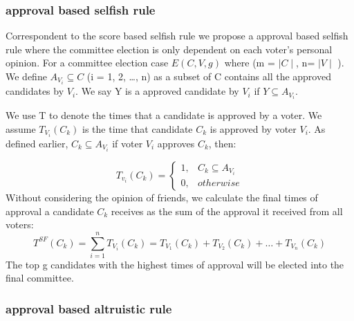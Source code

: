 \documentclass[
   a4paper,                      %
   tucfont,                      %
   english,                      %
   tuctitle,                     %
   intoc,                        %
   twoside,                      %
   captions=tableheading,        %
   openright,                    %
   final,                        %
   ]{tuc-thesis}                 %
\begin{document}
\subsubsection{approval based selfish rule}
Correspondent to the score based selfish rule we propose a approval based selfish rule where the committee election is only dependent on each voter's personal opinion. For a committee election case  $E(C,V,g)$ where (m = $\mid C \mid$, n= $\mid V \mid$ ). We define $A_{V_i}  \subseteq C$ (i = 1, 2,  \dots , n) as a subset of C contains all the approved candidates by $V_i$. We say Y is a approved candidate by $V_i$ if $Y \subseteq A_{V_i}$.

We use T to denote the times that a candidate is approved by a voter. We assume $T_{V_i}(C_k)$ is the time that candidate $C_k$ is approved by voter $V_i$. As defined earlier, $C_k \subseteq A_{V_i}$ if voter $V_i$ approves $C_k$, then: 

\begin{equation} 
        T_{v_i}(C_k) =
        \begin{cases}
        1, &C_k \subseteq A_{V_i} \\
        0, &otherwise
        \end{cases}\label{AB:SF_voter_Times}
\end{equation}
Without considering the opinion of friends, we calculate the final times of approval a candidate $C_k$ receives as the sum of the approval it received from all voters:
\begin{equation}
T^{SF}(C_k) = \sum_{i=1}^{n} T_{V_i}(C_k)= T_{V_1}(C_k) + T_{V_2}(C_k) + \dots + T_{V_n}(C_k)\label{AB:SF_aggr_voter_Score}
\end{equation}
The top g candidates with the highest times of approval will be elected into the final committee.

\subsubsection{approval based altruistic rule}
\end{document}
